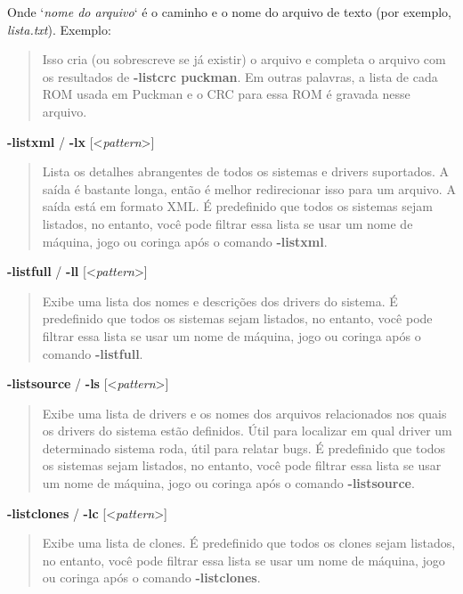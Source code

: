 \documentclass[letterpaper,10pt,brazil]{sphinxmanual}
\begin{document}
Onde `\emph{nome do arquivo}` é o caminho e o nome do arquivo de texto (por
exemplo, \emph{lista.txt}).
Exemplo:
\begin{quote}

Isso cria (ou sobrescreve se já existir) o arquivo  e
completa o arquivo com os resultados de \textbf{-listcrc puckman}.
Em outras palavras, a lista de cada ROM usada em Puckman e o CRC
para essa ROM é gravada nesse arquivo.
\end{quote}
\label{commandline/commandline-all:mame-commandline-listxml}
\textbf{-listxml} / \textbf{-lx} {[}\textless{}\emph{pattern}\textgreater{}{]}
\begin{quote}

Lista os detalhes abrangentes de todos os sistemas e drivers
suportados. A saída é bastante longa, então é melhor redirecionar
isso para um arquivo. A saída está em formato XML. É predefinido que
todos os sistemas sejam listados, no entanto, você pode filtrar essa
lista se usar um nome de máquina, jogo ou coringa após o comando
\textbf{-listxml}.
\end{quote}
\label{commandline/commandline-all:mame-commandline-listfull}
\textbf{-listfull} / \textbf{-ll} {[}\textless{}\emph{pattern}\textgreater{}{]}
\begin{quote}

Exibe uma lista dos nomes e descrições dos drivers do sistema.
É predefinido que todos os sistemas sejam listados, no entanto, você
pode filtrar essa lista se usar um nome de máquina, jogo ou coringa
após o comando \textbf{-listfull}.
\end{quote}
\label{commandline/commandline-all:mame-commandline-listsource}
\textbf{-listsource} / \textbf{-ls} {[}\textless{}\emph{pattern}\textgreater{}{]}
\begin{quote}

Exibe uma lista de drivers e os nomes dos arquivos relacionados nos
quais os drivers do sistema estão definidos. Útil para localizar em
qual driver um determinado sistema roda, útil para relatar bugs.
É predefinido que todos os sistemas sejam listados, no entanto, você
pode filtrar essa lista se usar um nome de máquina, jogo ou coringa
após o comando \textbf{-listsource}.
\end{quote}
\label{commandline/commandline-all:mame-commandline-listclones}
\textbf{-listclones} / \textbf{-lc} {[}\textless{}\emph{pattern}\textgreater{}{]}
\begin{quote}

Exibe uma lista de clones. É predefinido que todos os clones sejam
listados, no entanto, você pode filtrar essa lista se usar um nome
de máquina, jogo ou coringa após o comando \textbf{-listclones}.
\end{quote}
\end{document}
